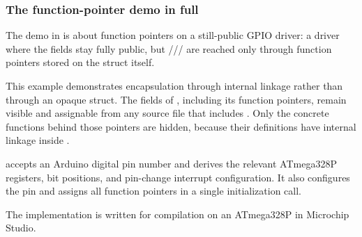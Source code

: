 \subsubsection{The function-pointer demo in full}
The demo in  is about function pointers on a still-public
GPIO driver: a  driver where the fields stay fully public, but
/// are reached only through function pointers
stored on the struct itself.

This example demonstrates encapsulation through  internal linkage rather than through
an opaque struct. The fields of , including its function pointers, remain visible and
assignable from any source file that includes . Only the concrete functions
behind those pointers are hidden, because their definitions have internal linkage inside
.

 accepts an Arduino digital pin number and derives the relevant ATmega328P
registers, bit positions, and pin-change interrupt configuration. It also configures the pin and
assigns all function pointers in a single initialization call.

The implementation is written for compilation on an ATmega328P in Microchip Studio.

